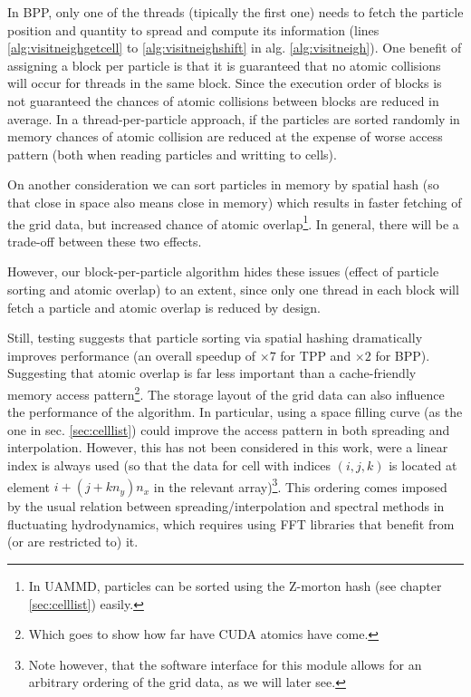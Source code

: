 \documentclass[ twoside,openright,titlepage,numbers=noenddot,%
headinclude,footinclude,cleardoublepage=empty,abstract=on,
BCOR=5mm,paper=a4,fontsize=11pt, dvipsnames
]{scrreprt}
\newcommand{\uammd}{\gls{UAMMD}\xspace}
\begin{document}
In BPP, only one of the threads (tipically the first one) needs to fetch the particle position and quantity to spread and compute its information (lines \ref{alg:visitneighgetcell} to \ref{alg:visitneighshift} in alg. \ref{alg:visitneigh}).
One benefit of assigning a block per particle is that it is guaranteed that no atomic collisions will occur for threads in the same block. Since the execution order of blocks is not guaranteed the chances of atomic collisions between blocks are reduced in average.
In a thread-per-particle approach, if the particles are sorted randomly in memory chances of atomic collision are reduced at the expense of worse access pattern (both when reading particles and writting to cells).

On another consideration we can sort particles in memory by spatial hash (so that close in space also means close in memory) which results in faster fetching of the grid data, but increased chance of atomic overlap\footnote{In \uammd, particles can be sorted using the Z-morton hash (see chapter \ref{sec:celllist}) easily.}. In general, there will be a trade-off between these two effects.

However, our block-per-particle algorithm hides these issues (effect of particle sorting and atomic overlap) to an extent, since only one thread in each block will fetch a particle and atomic overlap is reduced by design.

Still, testing suggests that particle sorting via spatial hashing dramatically improves performance (an overall speedup of $\times 7$ for TPP and $\times 2$ for BPP). Suggesting that atomic overlap is far less important than a cache-friendly memory access pattern\footnote{Which goes to show how far have CUDA atomics have come.}.
The storage layout of the grid data can also influence the performance of the algorithm. In particular, using a space filling curve (as the one in sec. \ref{sec:celllist}) could improve the access pattern in both spreading and interpolation\cite{Shih2021}. However, this has not been considered in this work, were a linear index is always used (so that the data for cell with indices $(i,j,k)$ is located at element $i+(j+kn_y)n_x$ in the relevant array)\footnote{Note however, that the software interface for this module allows for an arbitrary ordering of the grid data, as we will later see.}. This ordering comes imposed by the usual relation between spreading/interpolation and spectral methods in fluctuating hydrodynamics, which requires using \gls{FFT} libraries that benefit from (or are restricted to) it.
\end{document}
